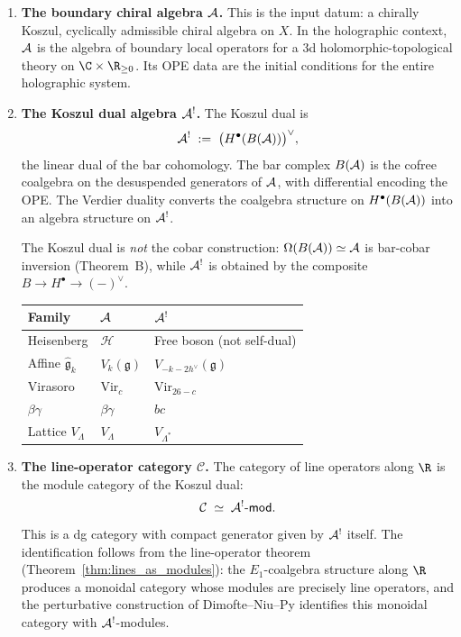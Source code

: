 \begin{enumerate}[label=\textbf{Component (\alph*):}, leftmargin=4.5em, itemsep=1.5ex]

\item \textbf{The boundary chiral algebra $\mathcal{A}$.}
This is the input datum: a chirally Koszul, cyclically admissible
chiral algebra on $X$. In the holographic context, $\mathcal{A}$ is the
algebra of boundary local operators for a 3d holomorphic-topological
theory on $\C \times \R_{\ge 0}$. Its OPE data are the initial
conditions for the entire holographic system.

\item \textbf{The Koszul dual algebra $\mathcal{A}^!$.}
The Koszul dual is
\begin{equation}%
\cA^! \;:=\; \bigl(H^\bullet(B(\cA))\bigr)^\vee,
\end{equation}
the linear dual of the bar cohomology. The bar complex $B(\mathcal{A})$ is
the cofree coalgebra on the desuspended generators of $\mathcal{A}$, with
differential encoding the OPE. The Verdier duality converts the
coalgebra structure on $H^\bullet(B(\mathcal{A}))$ into an algebra structure
on $\mathcal{A}^!$.

The Koszul dual is \emph{not} the cobar construction: $\Omega(B(\mathcal{A}))
\simeq \mathcal{A}$ is bar-cobar inversion (Theorem~B), while $\mathcal{A}^!$ is
obtained by the composite $B \to H^\bullet \to (-)^\vee$.

\begin{center}
\renewcommand{\arraystretch}{1.2}
\small
\begin{tabular}{lll}
\textbf{Family} & $\mathcal{A}$ & $\mathcal{A}^!$ \\
\hline
Heisenberg & $\mathcal{H}$ & Free boson (not self-dual) \\
Affine $\widehat{\mathfrak{g}}_k$ & $V_k(\mathfrak{g})$
 & $V_{-k-2h^\vee}(\mathfrak{g})$ \\
Virasoro & $\mathrm{Vir}_c$ & $\mathrm{Vir}_{26-c}$ \\
$\beta\gamma$ & $\beta\gamma$ & $bc$ \\
Lattice $V_\Lambda$ & $V_\Lambda$ & $V_{\Lambda^*}$
\end{tabular}
\end{center}

\item \textbf{The line-operator category $\mathcal{C}$.}
The category of line operators along $\R$ is the module category of
the Koszul dual:
\begin{equation}%
\mathcal{C} \;\simeq\; \cA^!\text{-}\mathsf{mod}.
\end{equation}
This is a dg category with compact generator given by $\mathcal{A}^!$ itself.
The identification follows from the line-operator theorem
(Theorem~\ref{thm:lines_as_modules}): the $E_1$-coalgebra structure
along $\R$ produces a monoidal category whose modules are precisely
line operators, and the perturbative construction of Dimofte--Niu--Py
identifies this monoidal category with $\mathcal{A}^!$-modules.


\end{enumerate}

